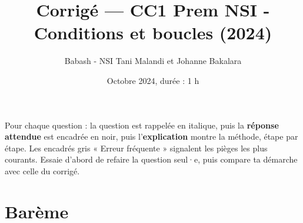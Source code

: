 \documentclass[addpoints, 11pt]{exam}
\title{Corrigé --- CC1 Prem NSI - Conditions et boucles (2024)}
\author{Babash - NSI Tani Malandi et Johanne Bakalara}
\date{Octobre 2024, durée : 1 h}
\DeclareRobustCommand{\_}{\textunderscore\allowbreak}
\begin{document}
\pagestyle{headandfoot}
\firstpageheader{}{}{}

\maketitle
\thispagestyle{headandfoot}

\begin{astuce}
Pour chaque question : la question est rappelée en italique, puis la \textbf{réponse attendue} est encadrée en noir, puis l'\textbf{explication} montre la méthode, étape par étape.
Les encadrés gris « Erreur fréquente » signalent les pièges les plus courants. Essaie d'abord de refaire la question seul·e, puis compare ta démarche avec celle du corrigé.
\end{astuce}

\section*{Barème}
\begin{center}
  \gradetable[h]
\end{center}
\end{document}
